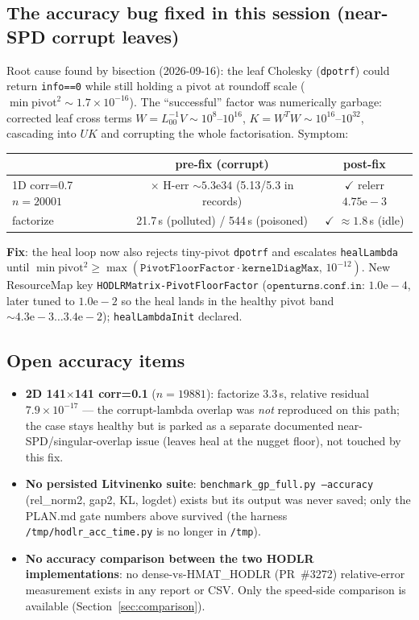 \documentclass[11pt,a4paper]{article}
\newcommand{\good}{\textcolor{green!50!black}{$\checkmark$}}
\newcommand{\bad}{\textcolor{red!70!black}{$\times$}}
\begin{document}
\subsection{The accuracy bug fixed in this session (near-SPD corrupt leaves)}
Root cause found by bisection (2026-09-16): the leaf Cholesky (\texttt{dpotrf})
could return \texttt{info==0} while still holding a pivot at roundoff scale
($\min\text{pivot}^2\sim1.7\times10^{-16}$). The ``successful'' factor was
numerically garbage: corrected leaf cross terms
$W=L_{00}^{-1}V\sim10^{8}\text{--}10^{16}$, $K=W^{T}W\sim10^{16}\text{--}10^{32}$,
cascading into $UK$ and corrupting the whole factorisation.  Symptom:

\begin{center}
\small
\begin{tabular}{lcc}
\toprule
 & pre-fix (corrupt) & post-fix \\
\midrule
1D corr=0.7 $n=20001$ & \bad{} H-err $\sim 5.3\text{e}34$ (5.13/5.3 in records) & \good{} relerr $4.75\text{e}-3$\\
factorize & 21.7\,s (polluted) / 544\,s (poisoned) & \good{} $\approx 1.8$\,s (idle)\\
\bottomrule
\end{tabular}
\end{center}

\noindent\textbf{Fix}: the heal loop now also rejects tiny-pivot \texttt{dpotrf}
and escalates \texttt{healLambda} until
$\min\text{pivot}^2 \ge \max(\texttt{PivotFloorFactor}\cdot\texttt{kernelDiagMax},\,
10^{-12})$.  New ResourceMap key \texttt{HODLRMatrix-PivotFloorFactor}
($\texttt{openturns.conf.in}$: $1.0\text{e}-4$, later tuned to $1.0\text{e}-2$ so
the heal lands in the healthy pivot band $\sim 4.3\text{e}-3\dots 3.4\text{e}-2$);
\texttt{healLambdaInit} declared.

\subsection{Open accuracy items}
\begin{itemize}
\item \textbf{2D 141$\times$141 corr=0.1} ($n=19881$): factorize 3.3\,s,
  relative residual $7.9\times10^{-17}$ --- the corrupt-lambda overlap was
  \emph{not} reproduced on this path; the case stays healthy but is parked as a
  separate documented near-SPD/singular-overlap issue (leaves heal at the
  nugget floor), not touched by this fix.
\item \textbf{No persisted Litvinenko suite}: \texttt{benchmark\_gp\_full.py
  --accuracy} (rel\_norm2, gap2, KL, logdet) exists but its output was never
  saved; only the PLAN.md gate numbers above survived (the harness
  \texttt{/tmp/hodlr\_acc\_time.py} is no longer in \texttt{/tmp}).
\item \textbf{No accuracy comparison between the two HODLR implementations}:
  no dense-vs-HMAT\_HODLR (PR~\#3272) relative-error measurement exists in any
  report or CSV. Only the speed-side comparison is available
  (Section~\ref{sec:comparison}).
\end{itemize}
\end{document}
